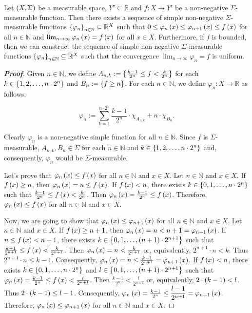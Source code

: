 \begin{theorem}
  \rm Let $\left(X,\Sigma\right)$ be a measurable space, $Y'\subseteq\overline{\mathbb{R}}$ and $f:X\rightarrow Y'$ be a non-negative $\Sigma$-measurable function. Then there exists a sequence of simple non-negative $\Sigma$-measurable functions $\left\{\varphi_n\right\}_{n\in\mathbb{N}}\subseteq\mathbb{R}^X$ such that $0\leq\varphi_n\left(x\right)\leq\varphi_{n+1}\left(x\right)\leq f\left(x\right)$ for all $n\in\mathbb{N}$ and $\lim_{n\to\infty}{\varphi_n\left(x\right)}=f\left(x\right)$ for all $x\in X$. Furthermore, if $f$ is bounded, then we can construct the sequence of simple non-negative $\Sigma$-measurable functions $\left\{\varphi_n\right\}_{n\in\mathbb{N}}\subseteq\mathbb{R}^X$ such that the convergence $\lim_{n\to\infty}{\varphi_n}=f$ is uniform.

  \begin{proof}[\rm\textbf{Proof}]
    Given $n\in\mathbb{N}$, we define $A_{n,k}:=\left\{\frac{k-1}{2^n}\leq f<\frac{k}{2^n}\right\}$ for each $k\in\left\{1,2,\dots, n\cdot 2^n\right\}$ and $B_n:=\left\{f\geq n\right\}$. For each $n\in\mathbb{N}$, we define $\varphi_n:X\rightarrow\mathbb{R}$ as follows:

    \begin{equation}
      \varphi_n:=\sum_{k=1}^{n\cdot 2^n}{\dfrac{k-1}{2^n}}\cdot\chi_{A_{n,k}}+n\cdot\chi_{B_n}.
    \end{equation}

    Clearly $\varphi_n$ is a non-negative simple function for all $n\in\mathbb{N}$. Since $f$ is $\Sigma$-measurable, $A_{n,k},B_n\in\Sigma$ for each $n\in\mathbb{N}$ and $k\in\left\{1,2,\dots,n\cdot 2^n\right\}$ and, consequently, $\varphi_n$ would be $\Sigma$-measurable.

    Let's prove that $\varphi_n\left(x\right)\leq f\left(x\right)$ for all $n\in\mathbb{N}$ and $x\in X$. Let $n\in\mathbb{N}$ and $x\in X$. If $f\left(x\right)\geq n$, then $\varphi_n\left(x\right)=n\leq f\left(x\right)$. If $f\left(x\right)<n$, there exists $k\in\left\{0,1,\dots,n\cdot 2^n\right\}$ such that $\frac{k-1}{2^n}\leq f\left(x\right)<\frac{k}{2^n}$. Then $\varphi_n\left(x\right)=\frac{k-1}{2^n}\leq f\left(x\right)$. Therefore, $\varphi_n\left(x\right)\leq f\left(x\right)$ for all $n\in\mathbb{N}$ and $x\in X$.

    Now, we are going to show that $\varphi_n\left(x\right)\leq \varphi_{n+1}\left(x\right)$ for all $n\in\mathbb{N}$ and $x\in X$. Let $n\in\mathbb{N}$ and $x\in X$. If $f\left(x\right)\geq n+1$, then $\varphi_n\left(x\right)=n<n+1=\varphi_{n+1}\left(x\right)$. If $n\leq f\left(x\right)<n+1$, there exists $k\in\left\{0,1,\dots,\left(n+1\right)\cdot 2^{n+1}\right\}$ such that $\frac{k-1}{2^{n+1}}\leq f\left(x\right)<\frac{k}{2^{n+1}}$. Then $\varphi_n\left(x\right)=n<\frac{k}{2^{n+1}}$ or, equivalently, $2^{n+1}\cdot n<k$. Thus $2^{n+1}\cdot n\leq k-1$. Consequently, $\varphi_n\left(x\right)=n\leq\frac{k-1}{2^{n+1}}=\varphi_{n+1}\left(x\right)$. If $f\left(x\right)<n$, there exists $k\in\left\{0,1,\dots,n\cdot 2^n\right\}$ and $l\in\left\{0,1,\dots, \left(n+1\right)\cdot 2^{n+1}\right\}$ such that $\varphi_n\left(x\right)=\frac{k-1}{2^n}\leq f\left(x\right)<\frac{l}{2^{n+1}}$. Then $\frac{k-1}{2^n}<\frac{l}{2^{n+1}}$ or, equivalently, $2\cdot\left(k-1\right)<l$. Thus $2\cdot\left(k-1\right)\leq l-1$. Consequently, $\varphi_n\left(x\right)=\frac{k-1}{2^n}\leq\dfrac{l-1}{2^{n+1}}=\varphi_{n+1}\left(x\right)$. Therefore, $\varphi_n\left(x\right)\leq \varphi_{n+1}\left(x\right)$ for all $n\in\mathbb{N}$ and $x\in X$.


\end{proof}
\end{theorem}
